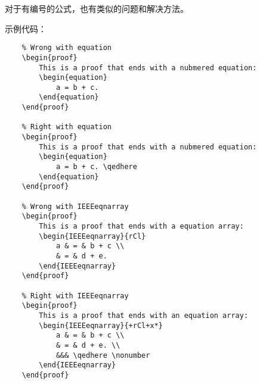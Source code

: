 \documentclass[UTF8]{ctexart}
\begin{document}
对于有编号的公式，也有类似的问题和解决方法。

示例代码：
\begin{verbatim}
    % Wrong with equation
    \begin{proof}
        This is a proof that ends with a nubmered equation:
        \begin{equation}
            a = b + c.
        \end{equation}
    \end{proof}

    % Right with equation
    \begin{proof}
        This is a proof that ends with a nubmered equation:
        \begin{equation}
            a = b + c. \qedhere
        \end{equation}
    \end{proof}

    % Wrong with IEEEeqnarray
    \begin{proof}
        This is a proof that ends with a equation array:
        \begin{IEEEeqnarray}{rCl}
            a & = & b + c \\
            & = & d + e.
        \end{IEEEeqnarray}
    \end{proof}

    % Right with IEEEeqnarray
    \begin{proof}
        This is a proof that ends with an equation array:
        \begin{IEEEeqnarray}{+rCl+x*}
            a & = & b + c \\
            & = & d + e. \\
            &&& \qedhere \nonumber
        \end{IEEEeqnarray}
    \end{proof}
\end{verbatim}
\end{document}

